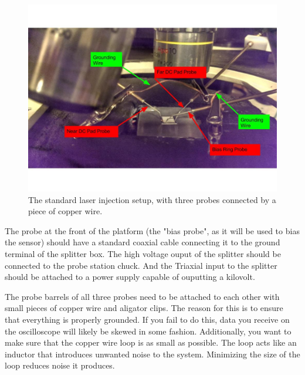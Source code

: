 \documentclass{report}
\begin{document}
            \begin{figure}[h] 
                \includegraphics[height=.4\textheight]{probe_tips_00}
                \centering
                \caption{ The standard laser injection setup, with three probes connected by a piece of copper wire. }
                \label{fig:probe_tips_00}
            \end{figure}

            The probe at the front of the platform (the "bias probe", as it will be used to bias the sensor) should have a standard coaxial cable connecting it to the ground terminal of the splitter box. The high voltage ouput of the splitter should be connected to the probe station chuck. And the Triaxial input to the splitter should be attached to a power supply capable of ouputting a kilovolt. 
            
            The probe barrels of all three probes need to be attached to each other with small pieces of copper wire and aligator clips. The reason for this is to ensure that everything is properly grounded. If you fail to do this, data you receive on the oscilloscope will likely be skewed in some fashion. Additionally, you want to make sure that the copper wire loop is as small as possible. The loop acts like an inductor that introduces unwanted noise to the system. Minimizing the size of the loop reduces noise it produces.
\end{document}
